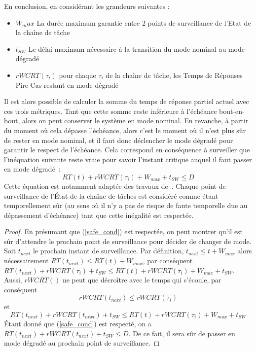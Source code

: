 \documentclass[french, a4paper, 11pt, twoside, pdftex]{StyleThese}
\begin{document}
	En conclusion, en considérant les grandeurs suivantes : 
	\begin{itemize}
		\item 	$ W_max $ La durée maximum garantie entre 2 points de surveillance de l'Etat de la chaîne de tâche
		\item 	$ t_{SW} $ Le délai maximum nécessaire à la transition du mode nominal au mode dégradé
		\item 	$ rWCRT(\tau_i) $ pour chaque $\tau_i$ de la chaîne de tâche, les Temps de Réponses Pire Cas restant en mode dégradé
	\end{itemize}
	Il est alors possible de calculer la somme du temps de réponse partiel actuel avec ces trois métriques. Tant que cette somme reste inférieure à l'échéance bout-en-bout, alors on peut conserver le système en mode nominal. En revanche, à partir du moment où cela dépasse l'échéance, alors c'est le moment où il n'est plus sûr de rester en mode nominal, et il faut donc déclencher le mode dégradé pour garantir le respect de l'échéance. Cela correspond en conséquence à surveiller que l'inéquation suivante reste vraie pour savoir l'instant critique auquel il faut passer en mode dégradé~:
	\begin{equation} \label{safe_cond}
		RT(t) + rWCRT(\tau_i) + W_{max} + t_{SW} \leq D
	\end{equation} 
	Cette équation est notamment adaptée des travaux de~\cite{kritikakou_run-time_2014}. Chaque point de surveillance de l'État de la chaîne de tâches est considéré comme étant temporellement sûr (au sens où il n'y a pas de risque de faute temporelle due au dépassement d'échéance) tant que cette inégalité est respectée.
    
    \begin{proof}
		En présumant que (\ref{safe_cond}) est respectée, on peut montrer qu'il est sûr d'attendre le prochain point de surveillance pour décider de changer de mode. Soit $t_{next}$ le prochain instant de surveillance.
		Par définition, $t_{next} \leq t + W_{max}$ alors nécessairement $RT(t_{next}) \leq RT(t) + W_{max}$, par conséquent  \\
		$RT(t_{next}) + rWCRT(\tau_i) + t_{SW} \leq RT(t) + rWCRT(\tau_i) + W_{max} + t_{SW}$. \\
		Aussi, $rWCRT()$ ne peut que décroître avec le temps qui s'écoule, par conséquent
		\[ rWCRT(t_{next}) \leq rWCRT(\tau_i)	\]
		et 
\[ RT(t_{next}) + rWCRT(t_{next}) + t_{SW} \leq RT(t) + rWCRT(\tau_i) + W_{max} + t_{SW} \] 
		Étant donné que (\ref{safe_cond}) est respecté, on a $RT(t_{next}) + rWCRT(t_{next}) + t_{SW} \leq D$.
		De ce fait, il sera sûr de passer en mode dégradé au prochain point de surveillance.  
    \end{proof}
    
\end{document}
